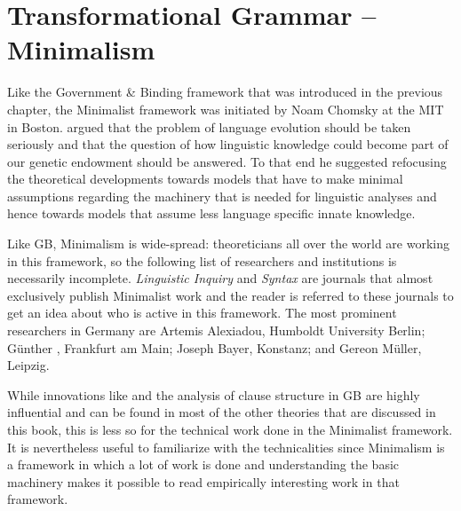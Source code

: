 \chapter{Transformational Grammar -- Minimalism}
\label{Abschnitt-MP}\label{chap-mp}\label{chapter-minimalism}\label{chapter-mp}

Like the Government \& Binding framework that was introduced in the previous chapter, the Minimalist
framework was initiated by Noam Chomsky at the MIT in Boston. \citet{Chomsky93b-u,Chomsky95a-u}
argued that the problem of language evolution should be taken seriously and that the question of how
linguistic knowledge could become part of our genetic endowment should be answered. To that end he
suggested refocusing the theoretical developments towards models that have to make minimal
assumptions regarding the machinery that is needed for linguistic analyses and hence towards models
that assume less language specific innate knowledge.  

Like GB, Minimalism is wide-spread: theoreticians all over the world are working in this
framework, so the following list of researchers and institutions is necessarily
incomplete. \emph{Linguistic Inquiry} and \emph{Syntax} are journals that almost exclusively publish
Minimalist work and the reader is referred to these journals to get an idea about who is active in
this framework. 
The most prominent researchers in Germany are 
Artemis Alexiadou, Humboldt University Berlin; 
Günther \citet{Grewendorf2002a}, Frankfurt am Main; 
Joseph Bayer, Konstanz; 
and Gereon Müller, Leipzig.

While innovations like \xbart and the analysis of clause structure in GB are highly influential and
can be found in most of the other theories that are discussed in this book, this is less so for the
technical work done in the Minimalist framework. It is nevertheless useful to familiarize with the
technicalities since Minimalism is a framework in which a lot of work is done and understanding the basic machinery makes it possible to read empirically interesting
work in that framework.

